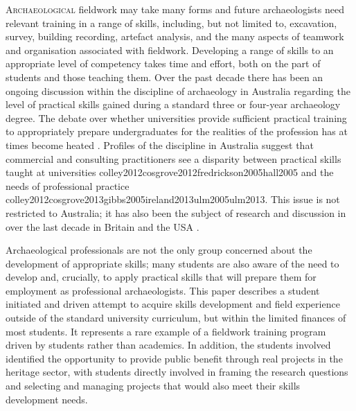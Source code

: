 \documentclass{ijsra}
\begin{document}
\lettrine[nindent=0em,lines=3]{A}{rchaeological} fieldwork may take many forms and future archaeologists need relevant training in a range of skills, including, but not limited to, excavation, survey, building recording, artefact analysis, and the many aspects of teamwork and organisation associated with fieldwork. 
Developing a range of skills to an appropriate level of competency takes time and effort, both on the part of students and those teaching them. Over the past decade there has been an ongoing discussion within the discipline of archaeology in Australia regarding the level of practical skills gained during a standard three or four-year archaeology degree. 
The debate over whether universities provide sufficient practical training to appropriately prepare undergraduates for the realities of the profession has at times become heated \parencites[e.g.][]{cobb2012}{mytum2012a}{ulm2005}{ulm2013}. 
Profiles of the discipline in Australia suggest that commercial and consulting practitioners see a disparity between practical skills taught at universities \parencite{beck2005}{colley2012}{cosgrove2012}{fredrickson2005}{hall2005}
 and the needs of professional practice \parencite{colley2004}{colley2012}{cosgrove2013}{gibbs2005}{ireland2013}{ulm2005}{ulm2013}. 
 This issue is not restricted to Australia; it has also been the subject of research and discussion in over the last decade in Britain \parencites [e.g.][]{aitchison2004}{cobb2012} and the USA
  \parencite[e.g.][]{boytner2012}.

Archaeological professionals are not the only group concerned about the development of appropriate skills; many students are also aware of the need to develop and, crucially, to apply practical skills that will prepare them for employment as professional archaeologists. 
This paper describes a student initiated and driven attempt to acquire skills development and field experience outside of the standard university curriculum, but within the limited finances of most students. 
It represents a rare example of a fieldwork training program driven by students rather than academics. 
In addition, the students involved identified the opportunity to provide public benefit through real projects in the heritage sector, with students directly involved in framing the research questions and selecting and managing projects that would also meet their skills development needs.
\end{document}
